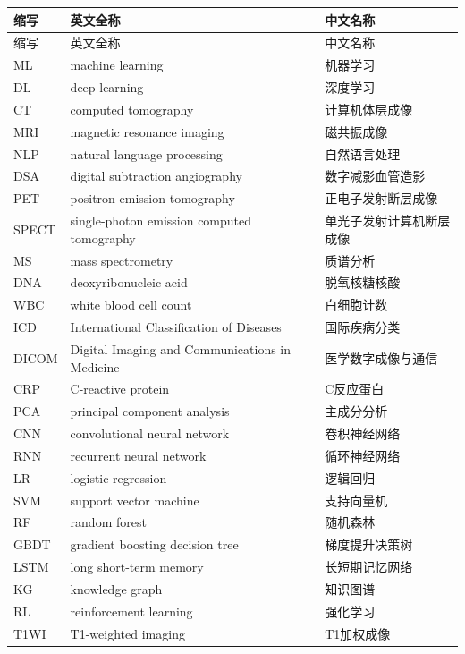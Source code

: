 \begin{center}
\small
\renewcommand{\arraystretch}{1.18}
\begin{longtable}{p{}p{}p{}}
\toprule
缩写 & 英文全称 & 中文名称\\
\midrule
\endfirsthead
\toprule
缩写 & 英文全称 & 中文名称\\
\midrule
\endhead
ML & machine learning & 机器学习\\
DL & deep learning & 深度学习\\
CT & computed tomography & 计算机体层成像\\
MRI & magnetic resonance imaging & 磁共振成像\\
NLP & natural language processing & 自然语言处理\\
DSA & digital subtraction angiography & 数字减影血管造影\\
PET & positron emission tomography & 正电子发射断层成像\\
SPECT & single-photon emission computed tomography & 单光子发射计算机断层成像\\
MS & mass spectrometry & 质谱分析\\
DNA & deoxyribonucleic acid & 脱氧核糖核酸\\
WBC & white blood cell count & 白细胞计数\\
ICD & International Classification of Diseases & 国际疾病分类\\
DICOM & Digital Imaging and Communications in Medicine & 医学数字成像与通信\\
CRP & C-reactive protein & C反应蛋白\\
PCA & principal component analysis & 主成分分析\\
CNN & convolutional neural network & 卷积神经网络\\
RNN & recurrent neural network & 循环神经网络\\
LR & logistic regression & 逻辑回归\\
SVM & support vector machine & 支持向量机\\
RF & random forest & 随机森林\\
GBDT & gradient boosting decision tree & 梯度提升决策树\\
LSTM & long short-term memory & 长短期记忆网络\\
KG & knowledge graph & 知识图谱\\
RL & reinforcement learning & 强化学习\\
T1WI & T1-weighted imaging & T1加权成像\\

\end{longtable}
\end{center}
